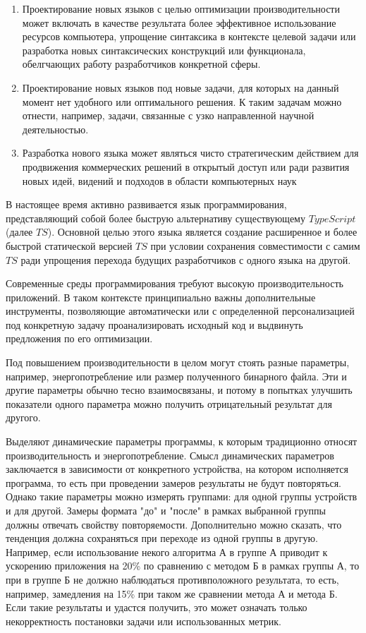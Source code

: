 \documentclass{mipt-thesis-bs}
\begin{document}
\begin{enumerate}
    \item Проектирование новых языков с целью оптимизации производительности
    может включать в качестве результата более эффективное использование
    ресурсов компьютера, упрощение синтаксика в контексте целевой задачи
    или разработка новых синтаксических конструкций или функционала,
    обелгчающих работу разработчиков конкретной сферы.
    \item  Проектирование новых языков под новые задачи, для которых на данный
    момент нет удобного или оптимального решения. К таким задачам можно отнести,
    например, задачи, связанные с узко направленной научной деятельностью.
    \item Разработка нового языка может являться чисто стратегическим действием
    для продвижения коммерческих решений в открытый доступ или ради развития
    новых идей, видений и подходов в области компьютерных наук
\end{enumerate}

В настоящее время активно развивается язык программирования, представляющий собой
более быструю альтернативу существующему $TypeScript$ (далее $TS$). Основной целью этого языка
является создание расширенное и более быстрой статической версией $TS$ при
условии сохранения совместимости с самим $TS$ ради упрощения перехода будущих разработчиков
с одного языка на другой.

Современные среды программирования требуют высокую производительность приложений. В таком
контексте принципиально важны дополнительные инструменты, позволяющие автоматически или с
определенной персонализацией под конкретную задачу проанализировать исходный код и выдвинуть
предложения по его оптимизации.

Под повышением производительности в целом могут стоять разные параметры, например,
энергопотребление или размер полученного бинарного файла. Эти и другие параметры обычно
тесно взаимосвязаны, и потому в попытках улучшить показатели одного параметра можно получить
отрицательный результат для другого.

Выделяют динамические параметры программы, к которым традиционно относят производительность
и энергопотребление. Смысл динамических параметров заключается в зависимости от конкретного устройства,
на котором исполняется программа, то есть при проведении замеров результаты не будут повторяться.
Однако такие параметры можно измерять группами: для одной группы устройств и для другой.
Замеры формата "до" и "после" в рамках выбранной группы должны отвечать свойству повторяемости.
Дополнительно можно сказать, что тенденция должна сохраняться при переходе из одной группы в другую.
Например, если использование некого алгоритма А в группе А приводит к ускорению приложения на 20\% по
сравнению с методом Б в рамках группы А, то при в группе Б не должно наблюдаться противположного результата,
то есть, например, замедления на 15\% при таком же сравнении метода А и метода Б. Если такие результаты и
удастся получить, это может означать только некорректность постановки задачи или использованных метрик.
\end{document}
